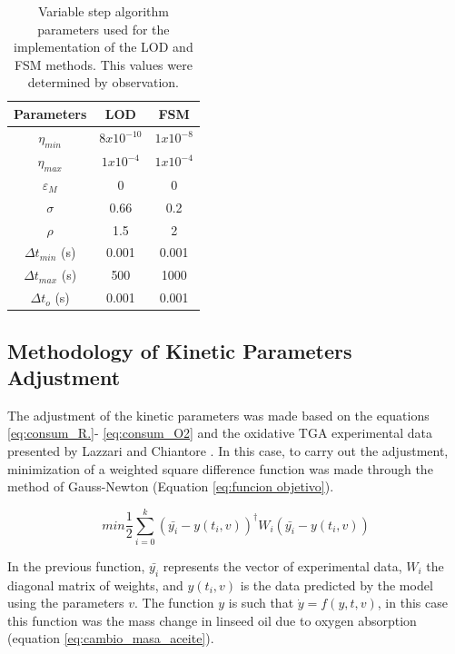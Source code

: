 \begin{refsection}
\begin{table}[H]
\centering
\caption{Variable step algorithm parameters used for the implementation of  the LOD and FSM methods. This values were determined by observation.}
\label{tab:parameters_vari_time _Step}
\begin{tabular}{|c|c|c|}
\hline
Parameters             & LOD          & FSM         \\ \hline
$\eta_{min}$           & $8x10^{-10}$ & $1x10^{-8}$ \\ \hline
$\eta_{max}$           & $1x10^{-4}$  & $1x10^{-4}$ \\ \hline
$\varepsilon_M$        & 0            & 0           \\ \hline
$\sigma$               & 0.66         & 0.2         \\ \hline
$\rho$                 & 1.5          & 2           \\ \hline
$\Delta   t_{min}$ (s) & 0.001        & 0.001       \\ \hline
$\Delta   t_{max}$ (s) & 500          & 1000        \\ \hline
$\Delta t_o$   (s)     & 0.001        & 0.001       \\ \hline
\end{tabular}%
\end{table}

\subsection{Methodology of Kinetic Parameters Adjustment}\label{subsec:parameters_adjustment_meth}
The adjustment of the kinetic parameters was made based on the equations 
\ref{eq:consum_R.}- \ref{eq:consum_O2} and the oxidative TGA experimental data presented by Lazzari and Chiantore \cite{lazzari1999drying}. In this case, to carry out the adjustment, minimization of a weighted square difference function was made through the method of Gauss-Newton (Equation  \ref{eq:funcion objetivo}).

\begin{equation}
 min \frac{1}{2}\sum_{i=0}^k (\bar{y_i}- y(t_i,v))^\dagger W_i (\bar{y_i}- y(t_i,v))
 \label{eq:funcion objetivo}
\end{equation}

In the previous function, $\bar{y_i}$ represents the vector of  experimental data, $W_i$ the diagonal matrix of weights, and $y(t_i,v)$ is the data predicted by the model using the parameters $v$. The function $y$ is such that $\dot{y}=f(y,t,v)$, in this case this function was the mass change in linseed oil due to oxygen absorption (equation \ref{eq:cambio_masa_aceite}).    


\end{refsection}
